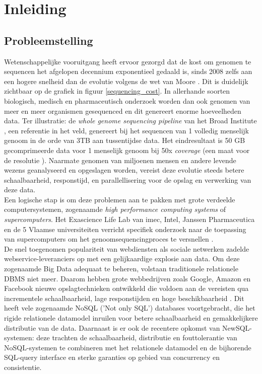 \chapter{Inleiding}
\label{inleiding}

\section{Probleemstelling}

Wetenschappelijke vooruitgang heeft ervoor gezorgd dat de kost om genomen te sequencen het afgelopen decennium exponentieel gedaald is, sinds 2008 zelfs aan een hogere snelheid dan de evolutie volgens de wet van Moore \cite{wetterstrand_sequencing_cost}. Dit is duidelijk zichtbaar op de grafiek in figuur \ref{sequencing_cost}. In allerhande soorten biologisch, medisch en pharmaceutisch onderzoek worden dan ook genomen van meer en meer organismen gesequenced en dit genereert enorme hoeveelheden data. Ter illustratie: de \textit{whole genome sequencing pipeline} van het Broad Institute \cite{broad_institute}, een referentie in het veld, genereert bij het sequencen van 1 volledig menselijk genoom in de orde van 3TB aan tussentijdse data. Het eindresultaat is 50 GB gecomprimeerde data voor 1 menselijk genoom bij 50x \textit{coverage} (een maat voor de resolutie \cite{coverage_definition}). Naarmate genomen van miljoenen mensen en andere levende wezens geanalyseerd en opgeslagen worden, vereist deze evolutie steeds betere schaalbaarheid, responstijd, en parallellisering voor de opslag en verwerking van deze data.\\

Een logische stap is om deze problemen aan te pakken met grote verdeelde computersystemen, zogenaamde \textit{high performance computing systems} of \textit{supercomputers}. Het Exascience Life Lab van imec, Intel, Janssen Pharmaceutica en de 5 Vlaamse universiteiten verricht specifiek onderzoek naar de toepassing van supercomputers om het genoomsequencingproces te versnellen \cite{lifelab_bwa}\cite{exascience_life_lab}.\\
De snel toegenomen populariteit van webdiensten als sociale netwerken zadelde webservice-leveranciers op met een gelijkaardige explosie aan data. Om deze zogenaamde Big Data \cite{mashey1997big} adequaat te beheren, volstaan traditionele relationele DBMS niet meer. Daarom hebben grote webbedrijven zoals Google, Amazon en Facebook nieuwe opslagtechnieken ontwikkeld die voldoen aan de vereisten qua incrementele schaalbaarheid, lage responstijden en hoge beschikbaarheid \cite{baker2011megastore}. Dit heeft vele zogenaamde NoSQL ('Not only SQL') databases voortgebracht, die het rigide relationele datamodel inruilen voor betere schaalbaarheid en gemakkelijkere distributie van de data. Daarnaast is er ook de recentere opkomst van NewSQL-systemen: deze trachten de schaalbaarheid, distributie en fouttolerantie van NoSQL-systemen te combineren met het relationele datamodel en de bijhorende SQL-query interface en sterke garanties op gebied van concurrency en consistentie.

